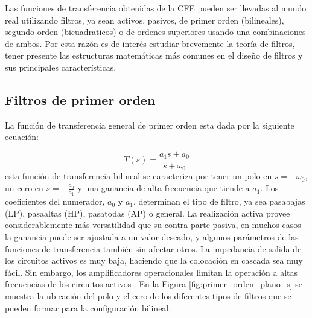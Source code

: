	Las funciones de transferencia obtenidas de la CFE pueden ser llevadas al mundo real utilizando filtros, ya sean activos, pasivos, de primer orden (bilineales), segundo orden (bicuadraticos) o de ordenes superiores usando una combinaciones de ambos. Por esta razón es de interés estudiar brevemente la teoría de filtros, tener presente las estructuras matemáticas más comunes en el diseño de filtros y sus principales características.
	
		\subsection{Filtros de primer orden}
	
	La función de transferencia general de primer orden esta dada por la siguiente ecuación:
	
	\begin{equation}
		T(s) = \frac{a_{1} s + a_{0} }{s + \omega_{0}}
		\label{ec:bilineal_general}
	\end{equation}
	esta función de transferencia bilineal se caracteriza por tener un polo en $s = - \omega_{0}$, un cero en $s = -\frac{a_{0}}{a_{1}}$ y una ganancia de alta frecuencia que tiende a $a_{1}$. Los coeficientes del numerador, $a_{0}$ y $a_{1}$, determinan el tipo de filtro, ya sea pasabajas (LP), pasaaltas (HP), pasatodas (AP) o general. La realización activa provee considerablemente más versatilidad que su contra parte pasiva, en muchos casos la ganancia puede ser ajustada a un valor deseado, y algunos parámetros de las funciones de transferencia también sin afectar otros. La impedancia de salida de los circuitos activos es muy baja, haciendo que la colocación en cascada sea muy fácil. Sin embargo, los amplificadores operacionales limitan la operación a altas frecuencias de los circuitos activos \cite{Sedra2015}. En la Figura \ref{fig:primer_orden_plano_s} se muestra la ubicación del polo y el cero de los diferentes tipos de filtros que se pueden formar para la configuración bilineal.
	
